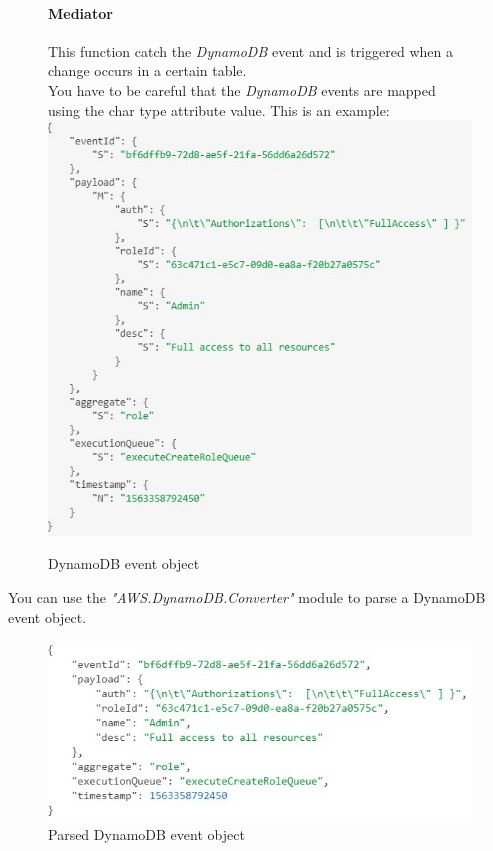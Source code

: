 \begin{figure} [H]
\paragraph{Mediator} \Spazio
This function catch the \emph{DynamoDB} event and is triggered when a change occurs in a certain table. \\
You have to be careful that the \emph{DynamoDB} events are mapped using the char type attribute value. This is an example: \\

	\centering
	\includegraphics[scale=1.2]{../Img/dynamoEvent}
	\caption{DynamoDB event object}\label{}
\end{figure}

You can use the \emph{"AWS.DynamoDB.Converter"} module to parse a DynamoDB event object.

\begin{figure} [H]
	\centering
	\includegraphics[scale=1.2]{../Img/parsedDynamoEvent}
	\caption{Parsed DynamoDB event object}\label{}
\end{figure}


